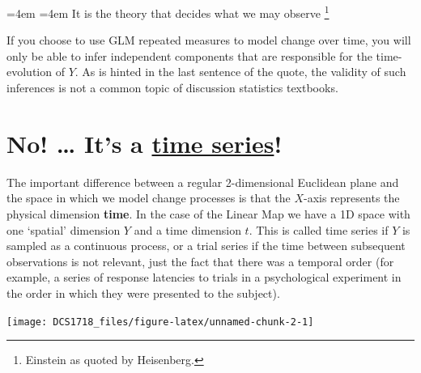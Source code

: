 \documentclass[12pt,]{book}
\let\rmarkdownfootnote\footnote%
\def\footnote{\protect\rmarkdownfootnote}
\renewenvironment{quote}{%
  \par \small \medskip \block
  \leftskip=4em \rightskip=4em%
  \noindent \ignorespaces}{%
  \par \medskip
  }
\let\stdsection\section
\renewcommand\section{\newpage\stdsection}
\theoremstyle{definition}
\theoremstyle{definition}
\theoremstyle{definition}
\theoremstyle{remark}
\begin{document}
\begin{quote}
It is the theory that decides what we may observe \footnote{Einstein as
  quoted by Heisenberg.}
\end{quote}

If you choose to use GLM repeated measures to model change over time,
you will only be able to infer independent components that are
responsible for the time-evolution of \(Y\). As is hinted in the last
sentence of the quote, the validity of such inferences is not a common
topic of discussion statistics textbooks.

\section*{\texorpdfstring{\textbf{No! \ldots{} It's a
\href{https://en.wikipedia.org/wiki/Time_series}{time
series}!}}{No! \ldots{} It's a time series!}}\label{no-its-a-time-series}

The important difference between a regular 2-dimensional Euclidean plane
and the space in which we model change processes is that the \(X\)-axis
represents the physical dimension \textbf{time}. In the case of the
Linear Map we have a 1D space with one `spatial' dimension \(Y\) and a
time dimension \(t\). This is called time series if \(Y\) is sampled as
a continuous process, or a trial series if the time between subsequent
observations is not relevant, just the fact that there was a temporal
order (for example, a series of response latencies to trials in a
psychological experiment in the order in which they were presented to
the subject).

\begin{center}\texttt{[image: DCS1718\_files/figure-latex/unnamed-chunk-2-1]} \end{center}
\end{document}
